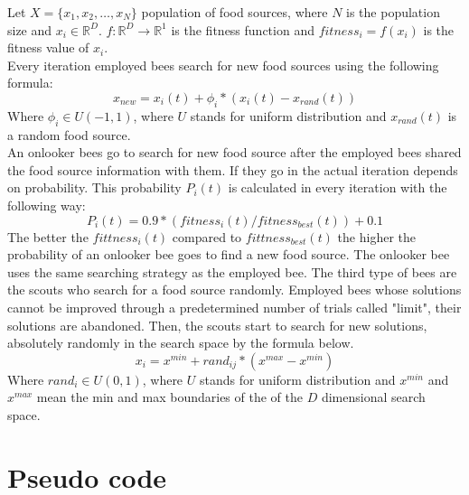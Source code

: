 \documentclass[border=0.2cm]{report}
\newcommand{\R}{\mathbb{R}} %
\begin{document}
\noindent
Let $X=\{x_1,x_2,\ldots,x_N\}$ population of food sources, where $N$ is the population size and $x_i \in \R^D$.
$f: \R^{D}\to\R^1$ is the fitness function and $fitness_i=f(x_i)$ is the fitness value of $x_i$.\\
Every iteration employed bees search for new food sources using the following formula:
\begin{equation}\label{eqn_abc_neighborhood_search}
x_{new}=x_i(t)+\phi_i*(x_i(t)-x_{rand}(t))
\end{equation}
Where $\phi_i \in U(-1, 1)$, where $U$ stands for uniform distribution and $x_{rand}(t)$ is a random food source. \\
An onlooker bees go to search for new food source after the employed bees shared the food source information with them. If they go in the actual iteration depends on probability. This probability $P_i(t)$ is calculated in every iteration with the following way:
\begin{equation}\label{eqn_abc_prob}
P_i(t)=0.9*(fitness_i(t)/fitness_{best}(t))+0.1
\end{equation}
The better the $fittness_i(t)$ compared to $fittness_{best}(t)$ the higher the probability of an onlooker bee goes to find a new food source. The onlooker bee uses the same searching strategy as the employed bee.
The third type of bees are the scouts who search for a food source randomly. Employed bees whose solutions cannot be improved through a predetermined number of trials called "limit", their solutions are abandoned. Then, the scouts start to search for new solutions, absolutely randomly in the search space by the formula below. 
\begin{equation}\label{eqn_abc_random_search}
x_{i}=x^{min}+rand_{ij}*(x^{max}-x^{min})
\end{equation}
Where $rand_{i} \in U(0, 1)$, where $U$ stands for uniform distribution and $x^{min}$ and $x^{max}$ mean the min and max boundaries of the of the $D$ dimensional search space. \\


\section{Pseudo code}
\end{document}
